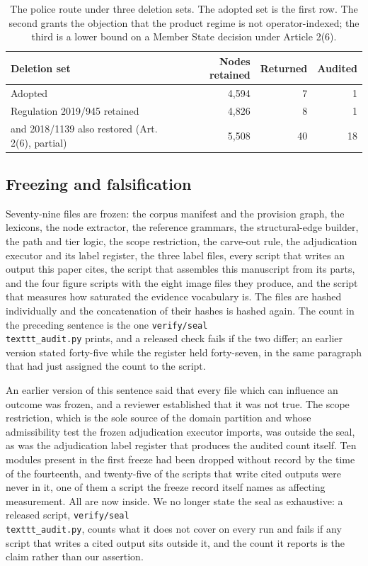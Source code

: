 \begin{table}[!htb]
\centering
\caption{The police route under three deletion sets. The adopted set is the first row. The second grants the objection that the product regime is not operator-indexed; the third is a lower bound on a Member State decision under Article 2(6).}
\label{tab:t5}
\footnotesize
\begin{tabularx}{\textwidth}{@{}Xrrr@{}}
\toprule
Deletion set & Nodes retained & Returned & Audited \\
\midrule
Adopted & 4,594 & 7 & 1 \\
Regulation 2019/945 retained & 4,826 & 8 & 1 \\
and 2018/1139 also restored (Art. 2(6), partial) & 5,508 & 40 & 18 \\
\bottomrule
\end{tabularx}
\end{table}

\subsection{Freezing and falsification}\label{sec:2.10}

Seventy-nine files are frozen: the corpus manifest and the provision graph, the lexicons, the node extractor, the reference grammars, the structural-edge builder, the path and tier logic, the scope restriction, the carve-out rule, the adjudication executor and its label register, the three label files, every script that writes an output this paper cites, the script that assembles this manuscript from its parts, and the four figure scripts with the eight image files they produce, and the script that measures how saturated the evidence vocabulary is. The files are hashed individually and the concatenation of their hashes is hashed again. The count in the preceding sentence is the one \texttt{verify/seal\\texttt{\_audit}.py} prints, and a released check fails if the two differ; an earlier version stated forty-five while the register held forty-seven, in the same paragraph that had just assigned the count to the script.

An earlier version of this sentence said that every file which can influence an outcome was frozen, and a reviewer established that it was not true. The scope restriction, which is the sole source of the domain partition and whose admissibility test the frozen adjudication executor imports, was outside the seal, as was the adjudication label register that produces the audited count itself. Ten modules present in the first freeze had been dropped without record by the time of the fourteenth, and twenty-five of the scripts that write cited outputs were never in it, one of them a script the freeze record itself names as affecting measurement. All are now inside. We no longer state the seal as exhaustive: a released script, \texttt{verify/seal\\texttt{\_audit}.py}, counts what it does not cover on every run and fails if any script that writes a cited output sits outside it, and the count it reports is the claim rather than our assertion.

